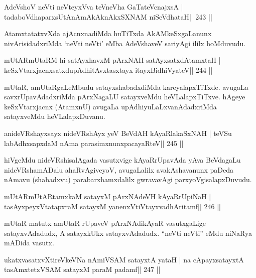 \begin{shl}
AdeVshoV neVti neVteyxVva teVneVha GaTateV\s cnajxsA |
tadaboVdhaparxsUtAnAmAkAknAkxSXNAM niSeVdhataH\hfill || 243 ||
\end{shl}

\begin{artha}
AtamxtatatxvXda ajAcnxnadiMda huTiTxda AkAMkeSxgaLanunx nivArisidadxriMda `neVti neVti' eMba AdeVshaveV sariyAgi ililx hoMduvudu.
\end{artha}


\begin{shl}
mUtARmUtaRM hi satAyxhavxM pArxNAH satAyxsatxdAtamxtaH | 
keSxVtarxjacnxsatxdupAdhitAvxtasxtayx itayxBidhiVyateV\hfill || 244 ||
\end{shl}

\begin{artha}
mUtaR, amUtaRgaLeMbudu satayxshabadxdiMda kareyalapxTiTxde. avugaLa savxrUpavAdadxriMda pArxNagaLU satayxveMdu heVLalapxTiTxve. hAgeye keSxVtarxjacnx (AtamxnU) avugaLa upAdhiyuLaLxvanAdadxriMda satayxveMdu heVLalapxDuvanu.
\end{artha}

\begin{shl}
anideVRshayxsayx nideVRshAyx yeV BeVdAH kAyaRlakaSxNAH |
teVSu labAdhxsapxdaM nAma parasimxnunxpacayaRteV\hfill || 245 ||
\end{shl}

\begin{artha}
hiVgeMdu nideVRshisalAgada vasutxvige kAyaRrUpavAda yAva BeVdagaLu nideVRshamADalu ahaRvAgiveyoV, avugaLalilx avakAshavanunx paDeda nAmavu (shabadxvu) parabarxhamxdalilx gwravavAgi parxyoVgisalapxDuvudu.
\end{artha}

\begin{shl}
mUtARmUtARtamxkaM satayxM pArxNAdeVH kAyaRrUpiNaH |
tasAyxpeyxVtatapxraM satayxM yanenxVtiVtayxvadhAritamf\hfill || 246 ||
\end{shl}

\begin{artha}
mUtaR matutx amUtaR rUpaveV pArxNAdikAyaR vasutxgaLige satayxvAdadudx,
A satayxkUkx satayxvAdadudx. ``neVti neVti'' eMdu niNaRya mADida vasutx.
\end{artha}


\begin{shl}
ukatxvasatxvXtireVkeVNa nAmiVSAM satayxtA yataH |
na cApayxsatayxtA tasAmxtetxVSAM satayxM paraM padamf\hfill || 247 ||
\end{shl}

